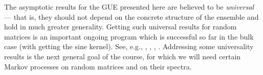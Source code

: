 \documentclass[letterpaper,11pt,oneside,reqno]{amsart}
\numberwithin{equation}{section}
\theoremstyle{definition}
\begin{document}
The asymptotic results for the GUE presented here
are believed to be \emph{universal} --- that is,
they should not depend on the concrete structure of the 
ensemble and hold in much greater generality. 
Getting such universal results for random matrices 
is an important ongoing program which is successful so far in 
the bulk case (with getting the sine kernel).
See, e.g.,
\cite{Johansson2001Universality}, \cite{tao2011univ},
\cite{TaoVu2012Survey}, \cite{erdHos2011universality}.
Addressing some universality results is the next general goal of the course, for which we 
will need certain Markov processes on random matrices and on their spectra.









\end{document}
